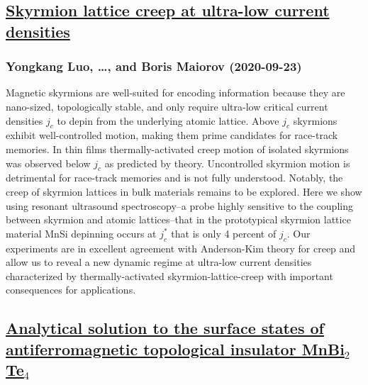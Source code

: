 \subsection*{\href{http://arxiv.org/abs/2009.11656v1}{Skyrmion lattice creep at ultra-low current densities}}
\subsubsection*{Yongkang Luo, \dots, and Boris Maiorov (2020-09-23)}
Magnetic skyrmions are well-suited for encoding information because they are
nano-sized, topologically stable, and only require ultra-low critical current
densities $j_c$ to depin from the underlying atomic lattice. Above $j_c$
skyrmions exhibit well-controlled motion, making them prime candidates for
race-track memories. In thin films thermally-activated creep motion of isolated
skyrmions was observed below $j_c$ as predicted by theory. Uncontrolled
skyrmion motion is detrimental for race-track memories and is not fully
understood. Notably, the creep of skyrmion lattices in bulk materials remains
to be explored. Here we show using resonant ultrasound spectroscopy--a probe
highly sensitive to the coupling between skyrmion and atomic lattices--that in
the prototypical skyrmion lattice material MnSi depinning occurs at $j_c^*$
that is only 4 percent of $j_c$. Our experiments are in excellent agreement
with Anderson-Kim theory for creep and allow us to reveal a new dynamic regime
at ultra-low current densities characterized by thermally-activated
skyrmion-lattice-creep with important consequences for applications.

\subsection*{\href{http://arxiv.org/abs/2009.11026v1}{Analytical solution to the surface states of antiferromagnetic  topological insulator MnBi$_2$Te$_4$}}
